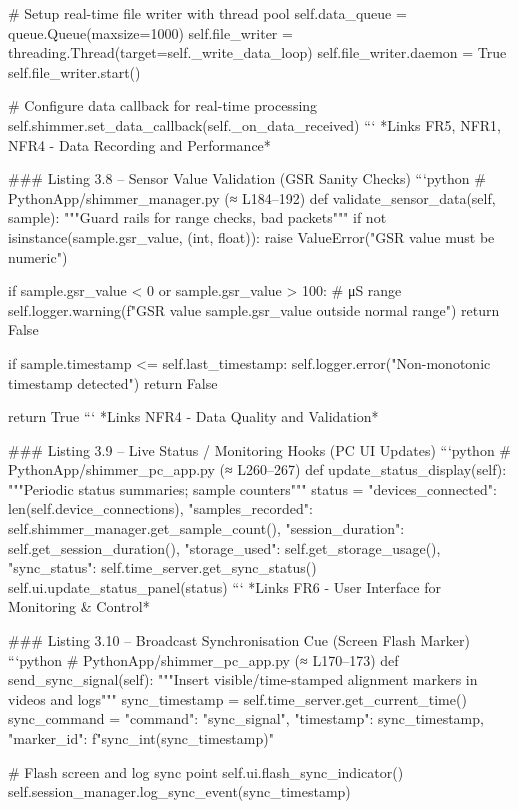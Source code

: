 \documentclass[12pt,a4paper]{article}
\begin{document}
{    # Setup real-time file writer with thread pool
    self.data_queue = queue.Queue(maxsize=1000)
    self.file_writer = threading.Thread(target=self._write_data_loop)
    self.file_writer.daemon = True
    self.file_writer.start()
    
    # Configure data callback for real-time processing
    self.shimmer.set_data_callback(self._on_data_received)
```
*Links FR5, NFR1, NFR4 - Data Recording and Performance*

### Listing 3.8 – Sensor Value Validation (GSR Sanity Checks)
```python
# PythonApp/shimmer_manager.py (≈ L184–192)
def validate_sensor_data(self, sample):
    """Guard rails for range checks, bad packets"""
    if not isinstance(sample.gsr_value, (int, float)):
        raise ValueError("GSR value must be numeric")
    
    if sample.gsr_value < 0 or sample.gsr_value > 100:  # μS range
        self.logger.warning(f"GSR value {sample.gsr_value} outside normal range")
        return False
    
    if sample.timestamp <= self.last_timestamp:
        self.logger.error("Non-monotonic timestamp detected")
        return False
    
    return True
```
*Links NFR4 - Data Quality and Validation*

### Listing 3.9 – Live Status / Monitoring Hooks (PC UI Updates)
```python
# PythonApp/shimmer_pc_app.py (≈ L260–267)
def update_status_display(self):
    """Periodic status summaries; sample counters"""
    status = {
        "devices_connected": len(self.device_connections),
        "samples_recorded": self.shimmer_manager.get_sample_count(),
        "session_duration": self.get_session_duration(),
        "storage_used": self.get_storage_usage(),
        "sync_status": self.time_server.get_sync_status()
    }
    self.ui.update_status_panel(status)
```
*Links FR6 - User Interface for Monitoring & Control*

### Listing 3.10 – Broadcast Synchronisation Cue (Screen Flash Marker)
```python
# PythonApp/shimmer_pc_app.py (≈ L170–173)
def send_sync_signal(self):
    """Insert visible/time-stamped alignment markers in videos and logs"""
    sync_timestamp = self.time_server.get_current_time()
    sync_command = {
        "command": "sync_signal",
        "timestamp": sync_timestamp,
        "marker_id": f"sync_{int(sync_timestamp)}"
    }
    
    # Flash screen and log sync point
    self.ui.flash_sync_indicator()
    self.session_manager.log_sync_event(sync_timestamp)
    
}
\end{document}
